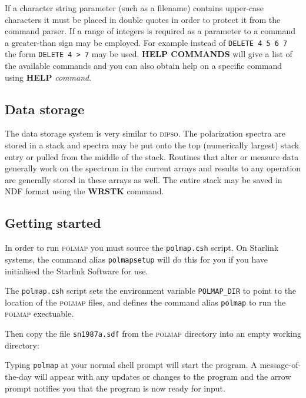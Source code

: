 \documentclass[11pt,nolof,noabs]{starlink}
\begin{document}
If a character string parameter (such as a filename) contains
upper-case characters it must be placed in double quotes in order to
protect it from the command parser. If a range of integers is required
as a parameter to a command a greater-than sign may be employed. For
example instead of \texttt{DELETE 4 5 6 7} the form \texttt{DELETE 4 > 7} may
be used. \textbf{HELP COMMANDS} will give a list of the available commands
and you can also obtain help on a specific command using \textbf{HELP}
\textit{command}.

\subsection{Data storage}

The data storage system is very similar to \textsc{dipso}. The polarization
spectra are stored in a stack and spectra may be put onto the top
(numerically largest) stack entry or pulled from the middle of the stack.
Routines that alter or measure data generally work on the spectrum in the
current arrays and results to any operation are generally stored in these
arrays as well. The entire stack may be saved in NDF format using the \textbf{WRSTK} command.

\subsection{Getting started}

In order to run \textsc{polmap} you must source the \texttt{polmap.csh} script.
On Starlink systems, the command alias \texttt{polmapsetup} will do this
for you if you have initialised the Starlink Software for use.

The \texttt{polmap.csh} script sets the environment variable \texttt{POLMAP\_DIR}
to point to the location of the \textsc{polmap} files, and defines the
command alias \texttt{polmap} to run the \textsc{polmap} exectuable.

Then copy the file \texttt{sn1987a.sdf} from the \textsc{polmap} directory
into an empty working directory:

\begin{terminalv}
\end{terminalv}

Typing \texttt{polmap} at your normal shell prompt will start the
program.  A message-of-the-day will appear with any updates or changes
to the program and the arrow prompt notifies you that the program is
now ready for input.
\end{document}
